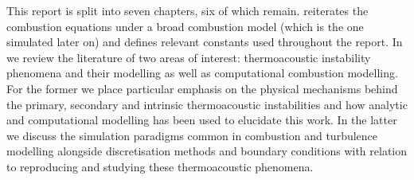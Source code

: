 This report is split into seven chapters, six of which remain.  reiterates the combustion equations under a broad combustion model (which is the one simulated later on) and defines relevant constants used throughout the report. In  we review the literature of two areas of interest: thermoacoustic instability phenomena and their modelling as well as computational combustion modelling. For the former we place particular emphasis on the physical mechanisms behind the primary, secondary and intrinsic thermoacoustic instabilities and how analytic and computational modelling has been used to elucidate this work. In the latter we discuss the simulation paradigms common in combustion and turbulence modelling alongside discretisation methods and boundary conditions with relation to reproducing and studying these thermoacoustic phenomena.





